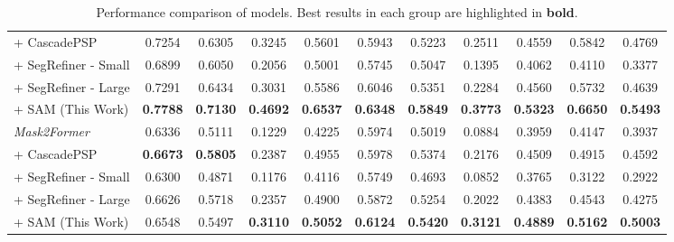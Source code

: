 \begin{table*}[h!]
\begin{adjustbox}{width=\textwidth}
\begin{tabular}{@{}l|c|c|c|c|c|c|c|c|c|c@{}}
+ CascadePSP \cite{cheng2020cascadepsp} & 0.7254 & 0.6305 & 0.3245 & 0.5601 & 0.5943 & 0.5223 & 0.2511 & 0.4559 & 0.5842 & 0.4769 \\
+ SegRefiner - Small \cite{wang2023segrefiner} & 0.6899 & 0.6050 & 0.2056 & 0.5001 & 0.5745 & 0.5047 & 0.1395 & 0.4062 & 0.4110 & 0.3377 \\
+ SegRefiner - Large \cite{wang2023segrefiner} & 0.7291 & 0.6434 & 0.3031 & 0.5586 & 0.6046 & 0.5351 & 0.2284 & 0.4560 & 0.5732 & 0.4639 \\
+ SAM (This Work) & \textbf{0.7788} & \textbf{0.7130} & \textbf{0.4692} & \textbf{0.6537} & \textbf{0.6348} & \textbf{0.5849} & \textbf{0.3773} & \textbf{0.5323} & \textbf{0.6650} & \textbf{0.5493} \\
\midrule
\textit{Mask2Former} \cite{cheng2022masked} & 0.6336 & 0.5111 & 0.1229 & 0.4225 & 0.5974 & 0.5019 & 0.0884 & 0.3959 & 0.4147 & 0.3937 \\
+ CascadePSP \cite{cheng2020cascadepsp} & \textbf{0.6673} & \textbf{0.5805} & 0.2387 & 0.4955 & 0.5978 & 0.5374 & 0.2176 & 0.4509 & 0.4915 & 0.4592 \\
+ SegRefiner - Small \cite{wang2023segrefiner} & 0.6300 & 0.4871 & 0.1176 & 0.4116 & 0.5749 & 0.4693 & 0.0852 & 0.3765 & 0.3122 & 0.2922 \\
+ SegRefiner - Large \cite{wang2023segrefiner} & 0.6626 & 0.5718 & 0.2357 & 0.4900 & 0.5872 & 0.5254 & 0.2022 & 0.4383 & 0.4543 & 0.4275 \\
+ SAM (This Work) & 0.6548 & 0.5497 & \textbf{0.3110} & \textbf{0.5052} & \textbf{0.6124} & \textbf{0.5420} & \textbf{0.3121} & \textbf{0.4889} & \textbf{0.5162} & \textbf{0.5003} \\
\bottomrule
\end{tabular}
\end{adjustbox}
\caption{Performance comparison of models. Best results in each group are highlighted in \textbf{bold}.}
\label{tab:performance_comparison}
\end{table*}
